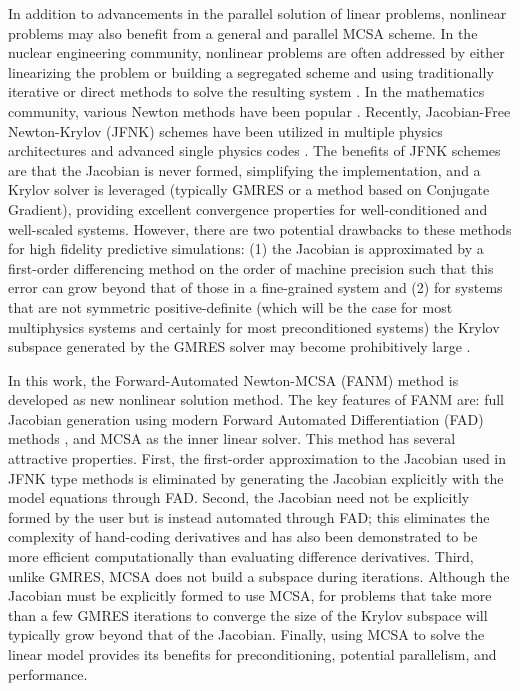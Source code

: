 In addition to advancements in the parallel solution of linear
problems, nonlinear problems may also benefit from a general and
parallel MCSA scheme. In the nuclear engineering community, nonlinear
problems are often addressed by either linearizing the problem or
building a segregated scheme and using traditionally iterative or
direct methods to solve the resulting system
\cite{pletcher_computational_1997}. In the mathematics community,
various Newton methods have been popular
\cite{kelley_iterative_1995}. Recently, Jacobian-Free Newton-Krylov
(JFNK) schemes \cite{knoll_jacobian-free_2004} have been utilized in
multiple physics architectures and advanced single physics codes
\cite{gaston_parallel_2009}. The benefits of JFNK schemes are that the
Jacobian is never formed, simplifying the implementation, and a Krylov
solver is leveraged (typically GMRES or a method based on Conjugate
Gradient), providing excellent convergence properties for
well-conditioned and well-scaled systems. However, there are two
potential drawbacks to these methods for high fidelity predictive
simulations: (1) the Jacobian is approximated by a first-order
differencing method on the order of machine precision such that this
error can grow beyond that of those in a fine-grained system
\cite{kelley_iterative_1995} and (2) for systems that are not
symmetric positive-definite (which will be the case for most
multiphysics systems and certainly for most preconditioned systems)
the Krylov subspace generated by the GMRES solver may become
prohibitively large \cite{knoll_newton-krylov_1995}.

In this work, the Forward-Automated Newton-MCSA (FANM) method is
developed as new nonlinear solution method. The key features of FANM
are: full Jacobian generation using modern Forward Automated
Differentiation (FAD) methods \cite{bartlett_automatic_2006}, and MCSA
as the inner linear solver. This method has several attractive
properties. First, the first-order approximation to the Jacobian used
in JFNK type methods is eliminated by generating the Jacobian
explicitly with the model equations through FAD. Second, the Jacobian
need not be explicitly formed by the user but is instead automated
through FAD; this eliminates the complexity of hand-coding derivatives
and has also been demonstrated to be more efficient computationally
than evaluating difference derivatives. Third, unlike GMRES, MCSA does
not build a subspace during iterations. Although the Jacobian must be
explicitly formed to use MCSA, for problems that take more than a few
GMRES iterations to converge the size of the Krylov subspace will
typically grow beyond that of the Jacobian. Finally, using MCSA to
solve the linear model provides its benefits for preconditioning,
potential parallelism, and performance.

